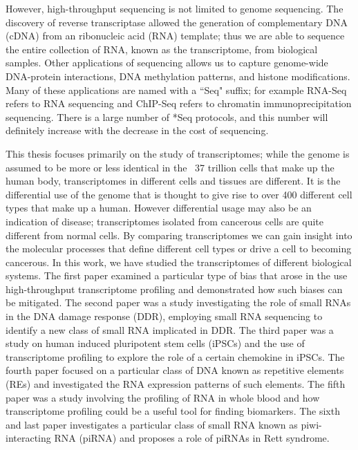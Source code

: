 However, high-throughput sequencing is not limited to genome sequencing. The discovery of reverse transcriptase\cite{pmid4316300, pmid4316301} allowed the generation of complementary DNA (cDNA) from an ribonucleic acid (RNA) template; thus we are able to sequence the entire collection of RNA, known as the transcriptome, from biological samples. Other applications of sequencing allows us to capture genome-wide DNA-protein interactions, DNA methylation patterns, and histone modifications\cite{applicationsofsequencing}. Many of these applications are named with a ``Seq" suffix; for example RNA-Seq refers to RNA sequencing and ChIP-Seq refers to chromatin immunoprecipitation sequencing. There is a large number of *Seq protocols\cite{pachter2014seq}, and this number will definitely increase with the decrease in the cost of sequencing.

This thesis focuses primarily on the study of transcriptomes; while the genome is assumed to be more or less identical in the ~37 trillion cells that make up the human body\cite{pmid23829164}, transcriptomes in different cells and tissues are different. It is the differential use of the genome that is thought to give rise to over 400 different cell types that make up a human\cite{pmid16790079}. However differential usage may also be an indication of disease; transcriptomes isolated from cancerous cells are quite different from normal cells. By comparing transcriptomes we can gain insight into the molecular processes that define different cell types or drive a cell to becoming cancerous. In this work, we have studied the transcriptomes of different biological systems. The first paper examined a particular type of bias that arose in the use high-throughput transcriptome profiling and demonstrated how such biases can be mitigated\cite{Tang01022013}. The second paper was a study investigating the role of small RNAs in the DNA damage response (DDR), employing small RNA sequencing to identify a new class of small RNA implicated in DDR\cite{francia2012site}. The third paper was a study on human induced pluripotent stem cells (iPSCs) and the use of transcriptome profiling to explore the role of a certain chemokine in iPSCs. The fourth paper focused on a particular class of DNA known as repetitive elements (REs) and investigated the RNA expression patterns of such elements. The fifth paper was a study involving the profiling of RNA in whole blood and how transcriptome profiling could be a useful tool for finding biomarkers. The sixth and last paper investigates a particular class of small RNA known as piwi-interacting RNA (piRNA) and proposes a role of piRNAs in Rett syndrome.

